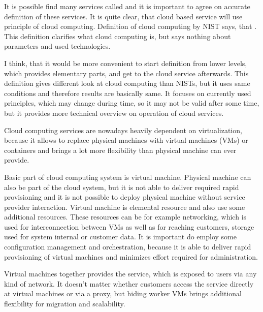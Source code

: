 
It is possible find many services called  and it is important to agree on accurate definition of these services. It is quite clear, that cloud based service will use principle of cloud computing. Definition of cloud computing by \Ac{NIST} says, that  \cite{cloud-definition}. This definition clarifies what cloud computing is, but says nothing about parameters and used technologies.

I think, that it would be more convenient to start definition from lower levels, which provides elementary parts, and get to the cloud service afterwards. This definition gives different look at cloud computing than \Ac{NIST}s, but it uses same conditions and therefore results are basically same. It focuses on currently used principles, which may change during time, so it may not be valid after some time, but it provides more technical overview on operation of cloud services.

Cloud computing services are nowadays heavily dependent on virtualization, because it allows to replace physical machines with virtual machines (\Ac{VM}s) or containers and brings a lot more flexibility than physical machine can ever provide.

Basic part of cloud computing system is virtual machine. Physical machine can also be part of the cloud system, but it is not able to deliver required rapid provisioning and it is not possible to deploy physical machine without service provider interaction. Virtual machine is elemental resource and also use some additional resources. These resources can be for example networking, which is used for interconnection between \Ac{VM}s as well as for reaching customers, storage used for system internal or customer data. It is important do employ some configuration management and orchestration, because it is able to deliver rapid provisioning of virtual machines and minimizes effort required for administration.

Virtual machines together provides the service, which is exposed to users via any kind of network. It doesn't matter whether customers access the service directly at virtual machines or via a proxy, but hiding worker \Ac{VM}s brings additional flexibility for migration and scalability. 

